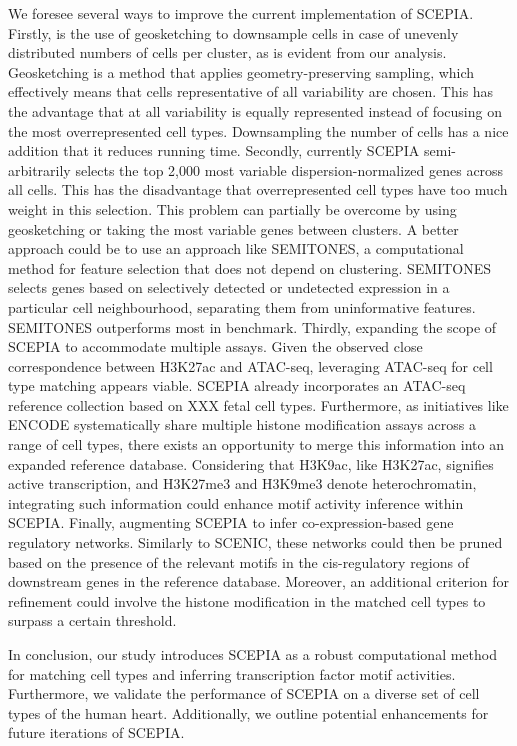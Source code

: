 We foresee several ways to improve the current implementation of SCEPIA. Firstly, is the use of geosketching to downsample cells in case of unevenly distributed numbers of cells per cluster\cite{Hie2019}, as is evident from our analysis. Geosketching is a method that applies geometry-preserving sampling, which effectively means that cells representative of all variability are chosen. This has the advantage that at all variability is equally represented instead of focusing on the most overrepresented cell types. Downsampling the number of cells has a nice addition that it reduces running time. Secondly, currently SCEPIA semi-arbitrarily selects the top 2,000 most variable dispersion-normalized genes across all cells. This has the disadvantage that overrepresented cell types have too much weight in this selection. This problem can partially be overcome by using geosketching or taking the most variable genes between clusters. A better approach could be to use an approach like SEMITONES\cite{Vlot2022}, a computational method for feature selection that does not depend on clustering. SEMITONES selects genes based on selectively detected or undetected expression in a particular cell neighbourhood, separating them from uninformative features. SEMITONES outperforms most in benchmark. Thirdly, expanding the scope of SCEPIA to accommodate multiple assays. Given the observed close correspondence between H3K27ac and ATAC-seq, leveraging ATAC-seq for cell type matching appears viable. SCEPIA already incorporates an ATAC-seq reference collection based on XXX fetal cell types. Furthermore, as initiatives like ENCODE\cite{encode_dcc} systematically share multiple histone modification assays across a range of cell types, there exists an opportunity to merge this information into an expanded reference database. Considering that H3K9ac, like H3K27ac, signifies active transcription\cite{Roth2001}, and H3K27me3 and H3K9me3 denote heterochromatin\cite{Saksouk2015}, integrating such information could enhance motif activity inference within SCEPIA. Finally, augmenting SCEPIA to infer co-expression-based gene regulatory networks. Similarly to SCENIC, these networks could then be pruned based on the presence of the relevant motifs in the cis-regulatory regions of downstream genes in the reference database. Moreover, an additional criterion for refinement could involve the histone modification in the matched cell types to surpass a certain threshold.

In conclusion, our study introduces SCEPIA as a robust computational method for matching cell types and inferring transcription factor motif activities. Furthermore, we validate the performance of SCEPIA on a diverse set of cell types of the human heart. Additionally, we outline potential enhancements for future iterations of SCEPIA.

